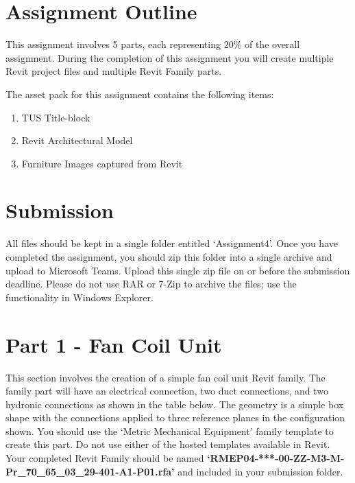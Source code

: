 \section*{Assignment Outline}
This assignment involves 5 parts, each representing 20\% of the overall assignment. During the completion of this assignment you will create multiple Revit project files and multiple Revit Family parts.


The asset pack for this assignment contains the following items:
\begin{enumerate}
	\item TUS Title-block
	\item Revit Architectural Model
	\item Furniture Images captured from Revit
\end{enumerate}


\section*{Submission}
All files should be kept in a single folder entitled ‘Assignment4’. Once you have completed the assignment, you should zip this folder into a single archive and upload to Microsoft Teams. Upload this single zip file on or before the submission deadline.  Please do not use RAR or 7-Zip to archive the files; use the functionality in Windows Explorer.





\newpage

\section*{Part 1 - Fan Coil Unit}
This section involves the creation of a simple fan coil unit Revit family. The family part will have an electrical connection, two duct connections, and two hydronic connections as shown in the table below. The geometry is a simple box shape with the connections applied to three reference planes in the configuration shown. You should use the ‘Metric Mechanical Equipment’ family template to create this part. Do not use either of the hosted templates available in Revit.  Your completed Revit Family should be named \textbf{‘RMEP04-***-00-ZZ-M3-M-Pr\_70\_65\_03\_29-401-A1-P01.rfa’} and included in your submission folder.\\

